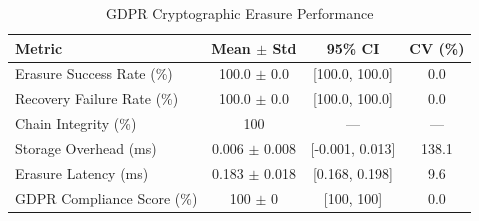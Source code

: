 
\begin{table}[t]
\centering
\caption{GDPR Cryptographic Erasure Performance}
\label{tab:gdpr_erasure}
\begin{tabular}{lccc}
\toprule
Metric & Mean $\pm$ Std & 95\% CI & CV (\%) \\
\midrule
Erasure Success Rate (\%) & 100.0 $\pm$ 0.0 & [100.0, 100.0] & 0.0 \\
Recovery Failure Rate (\%) & 100.0 $\pm$ 0.0 & [100.0, 100.0] & 0.0 \\
Chain Integrity (\%) & 100 & --- & --- \\
Storage Overhead (ms) & 0.006 $\pm$ 0.008 & [-0.001, 0.013] & 138.1 \\
Erasure Latency (ms) & 0.183 $\pm$ 0.018 & [0.168, 0.198] & 9.6 \\
GDPR Compliance Score (\%) & 100 $\pm$ 0 & [100, 100] & 0.0 \\
\bottomrule
\end{tabular}
\end{table}
